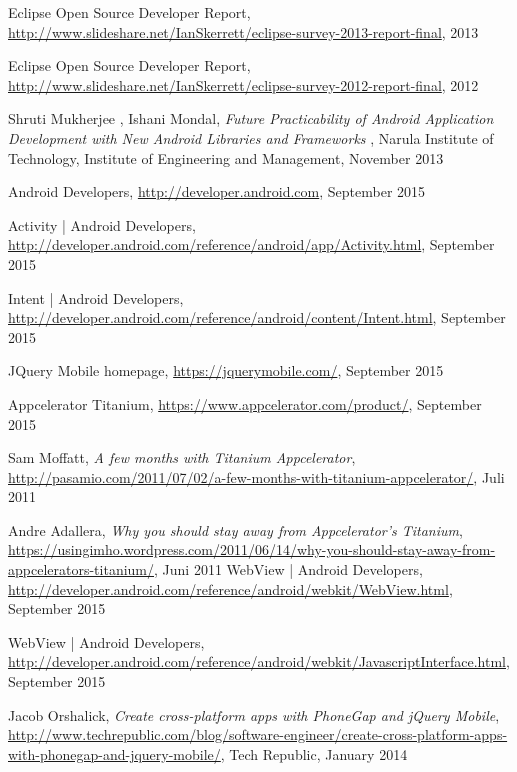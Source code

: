 \begin{thebibliography}{9}
	Eclipse Open Source Developer Report, 
	\url{http://www.slideshare.net/IanSkerrett/eclipse-survey-2013-report-final},
	2013
	
	Eclipse Open Source Developer Report, 
	\url{http://www.slideshare.net/IanSkerrett/eclipse-survey-2012-report-final},
	2012
	
	Shruti Mukherjee , Ishani Mondal, 
	\emph{Future Practicability of Android Application Development with New Android Libraries and Frameworks },
	Narula Institute of Technology, 
	Institute of Engineering and Management,
	November 2013 
	
	Android Developers,
	\url{http://developer.android.com},
	September 2015

	Activity | Android Developers,
	\url{http://developer.android.com/reference/android/app/Activity.html},
	September 2015
	
	Intent | Android Developers,
	\url{http://developer.android.com/reference/android/content/Intent.html},
	September 2015

	JQuery Mobile homepage,
	\url{https://jquerymobile.com/},
	September 2015

	Appcelerator Titanium,
	\url{https://www.appcelerator.com/product/},
	September 2015

	Sam Moffatt,
	\emph{A few months with Titanium Appcelerator},
	\url{http://pasamio.com/2011/07/02/a-few-months-with-titanium-appcelerator/},
	Juli 2011

	Andre Adallera,
\emph{Why you should stay away from Appcelerator’s Titanium},
\url{https://usingimho.wordpress.com/2011/06/14/why-you-should-stay-away-from-appcelerators-titanium/},
	Juni 2011
	WebView | Android Developers,
	\url{http://developer.android.com/reference/android/webkit/WebView.html},
	September 2015

	WebView | Android Developers,
	\url{http://developer.android.com/reference/android/webkit/JavascriptInterface.html},
	September 2015

Jacob Orshalick,
\emph{Create cross-platform apps with PhoneGap and jQuery Mobile},
\url{http://www.techrepublic.com/blog/software-engineer/create-cross-platform-apps-with-phonegap-and-jquery-mobile/},
	Tech Republic,
	January 2014


\end{thebibliography}
